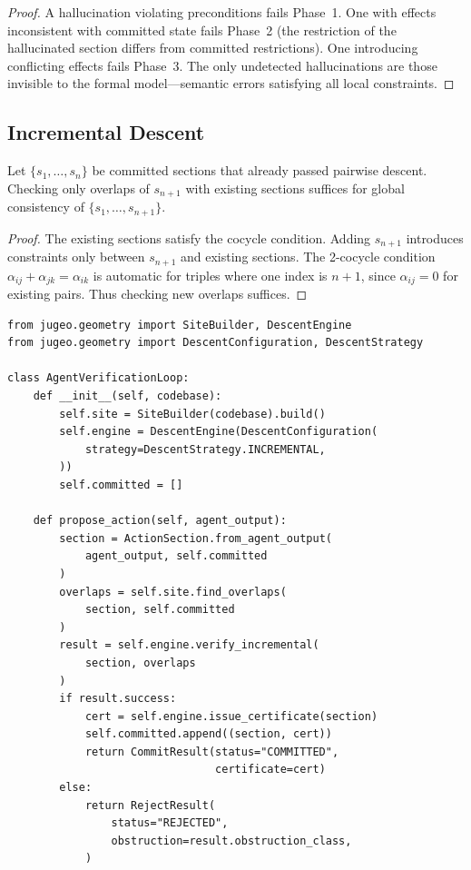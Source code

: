 \documentclass[11pt]{article}
\begin{document}
\begin{proof}
A hallucination violating preconditions fails Phase~1.  One with
effects inconsistent with committed state fails Phase~2 (the
restriction of the hallucinated section differs from committed
restrictions).  One introducing conflicting effects fails Phase~3.
The only undetected hallucinations are those invisible to the formal
model---semantic errors satisfying all local constraints.
\end{proof}

\subsection{Incremental Descent}\label{subsec:incremental}

\begin{proposition}\label{prop:incremental}
Let $\{s_1, \ldots, s_n\}$ be committed sections that already passed
pairwise descent.  Checking only overlaps of $s_{n+1}$ with existing
sections suffices for global consistency of $\{s_1, \ldots, s_{n+1}\}$.
\end{proposition}

\begin{proof}
The existing sections satisfy the cocycle condition.  Adding $s_{n+1}$
introduces constraints only between $s_{n+1}$ and existing sections.
The 2-cocycle condition $\alpha_{ij} + \alpha_{jk} = \alpha_{ik}$ is
automatic for triples where one index is $n+1$, since $\alpha_{ij} = 0$
for existing pairs.  Thus checking new overlaps suffices.
\end{proof}

\begin{lstlisting}[style=jugeo-python,caption={Incremental agent verification loop.}]
from jugeo.geometry import SiteBuilder, DescentEngine
from jugeo.geometry import DescentConfiguration, DescentStrategy

class AgentVerificationLoop:
    def __init__(self, codebase):
        self.site = SiteBuilder(codebase).build()
        self.engine = DescentEngine(DescentConfiguration(
            strategy=DescentStrategy.INCREMENTAL,
        ))
        self.committed = []

    def propose_action(self, agent_output):
        section = ActionSection.from_agent_output(
            agent_output, self.committed
        )
        overlaps = self.site.find_overlaps(
            section, self.committed
        )
        result = self.engine.verify_incremental(
            section, overlaps
        )
        if result.success:
            cert = self.engine.issue_certificate(section)
            self.committed.append((section, cert))
            return CommitResult(status="COMMITTED",
                                certificate=cert)
        else:
            return RejectResult(
                status="REJECTED",
                obstruction=result.obstruction_class,
            )
\end{lstlisting}
\end{document}
